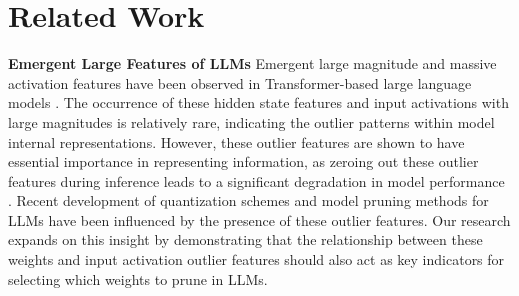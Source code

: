 \section{Related Work}
\label{rel_work}

\textbf{Emergent Large Features of LLMs} 
Emergent large magnitude and massive activation features have been observed in Transformer-based large language models \citep{kovaleva2021bert, puccetti2022outliers, wei2022outlier, dettmers2022gpt3, sun2024massive}. 
The occurrence of these hidden state features and input activations with large magnitudes is relatively rare, indicating the outlier patterns within model internal representations. However, these outlier features are shown to have essential importance in representing information, as zeroing out these outlier features during inference leads to a significant degradation in model performance \citep{dettmers2022gpt3, sun2024massive}. 
Recent development of quantization schemes \citep{lin2023awq, dettmers2023spqr, xiao2023smoothquant} and model pruning methods \citep{sun2023simple, zhangplug} for LLMs have been influenced by the presence of these outlier features. Our research expands on this insight by demonstrating that the relationship between these weights and input activation outlier features should also act as key indicators for selecting which weights to prune in LLMs.

